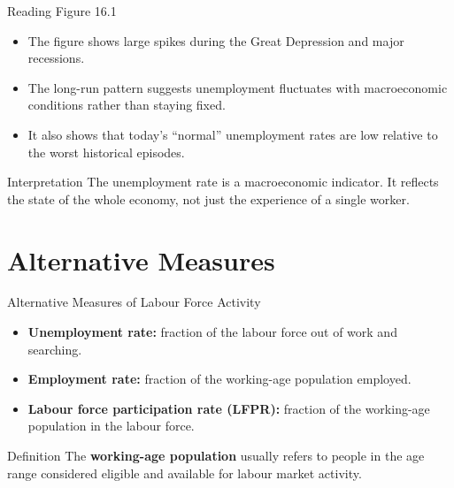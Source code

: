 \documentclass[aspectratio=169]{beamer}
\begin{document}
\begin{frame}{Reading Figure 16.1}
\transfade
\begin{itemize}[<+->]
  \item The figure shows large spikes during the Great Depression and major recessions.
  \item The long-run pattern suggests unemployment fluctuates with macroeconomic conditions rather than staying fixed.
  \item It also shows that today's ``normal'' unemployment rates are low relative to the worst historical episodes.
\end{itemize}

\begin{block}{Interpretation}
The unemployment rate is a macroeconomic indicator. It reflects the state of the whole economy, not just the experience of a single worker.
\end{block}
\end{frame}

\section{Alternative Measures}

\begin{frame}{Alternative Measures of Labour Force Activity}
\transfade
\begin{itemize}[<+->]
  \item \textbf{Unemployment rate:} fraction of the labour force out of work and searching.
  \item \textbf{Employment rate:} fraction of the working-age population employed.
  \item \textbf{Labour force participation rate (LFPR):} fraction of the working-age population in the labour force.
\end{itemize}

\begin{block}{Definition}
The \textbf{working-age population} usually refers to people in the age range considered eligible and available for labour market activity.
\end{block}
\end{frame}
\end{document}

